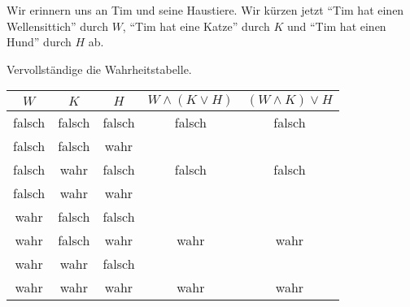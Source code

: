 \documentclass{uebungsblatt}
\begin{document}
\begin{exercise}
    Wir erinnern uns an Tim und seine Haustiere. Wir kürzen jetzt
    \enquote{Tim hat einen Wellensittich} durch $W$, \enquote{Tim hat eine Katze} durch $K$ und
    \enquote{Tim hat einen Hund} durch $H$ ab.

    Vervollständige die Wahrheitstabelle.

    \begin{center}
        \begin{tabular}{ccc cc}\toprule
            $W$ &$K$ & $H$ & $W \land (K \lor H)$ & $(W \land K) \lor H$\\\midrule
            falsch & falsch & falsch & falsch & falsch\\
            falsch & falsch & wahr \\
            falsch & wahr & falsch & falsch & falsch\\
            falsch & wahr & wahr\\
            wahr & falsch & falsch\\
            wahr & falsch & wahr & wahr & wahr\\
            wahr & wahr & falsch\\
            wahr & wahr & wahr & wahr & wahr\\\bottomrule
        \end{tabular}
    \end{center}


\end{exercise}

\end{document}
